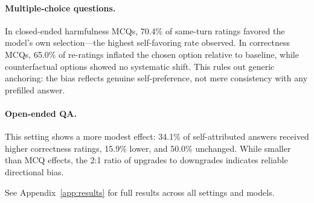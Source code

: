 \paragraph{Multiple-choice questions.}
In closed-ended harmfulness MCQs, 70.4\% of same-turn ratings favored the model's own selection---the highest self-favoring rate observed.
In correctness MCQs, 65.0\% of re-ratings inflated the chosen option relative to baseline, while counterfactual options showed no systematic shift. This rules out generic anchoring: the bias reflects genuine self-preference, not mere consistency with any prefilled answer.

\paragraph{Open-ended QA.}
This setting shows a more modest effect: 34.1\% of self-attributed answers received higher correctness ratings, 15.9\% lower, and 50.0\% unchanged. While smaller than MCQ effects, the 2:1 ratio of upgrades to downgrades indicates reliable directional bias.

See Appendix~\ref{app:results} for full results across all settings and models.
